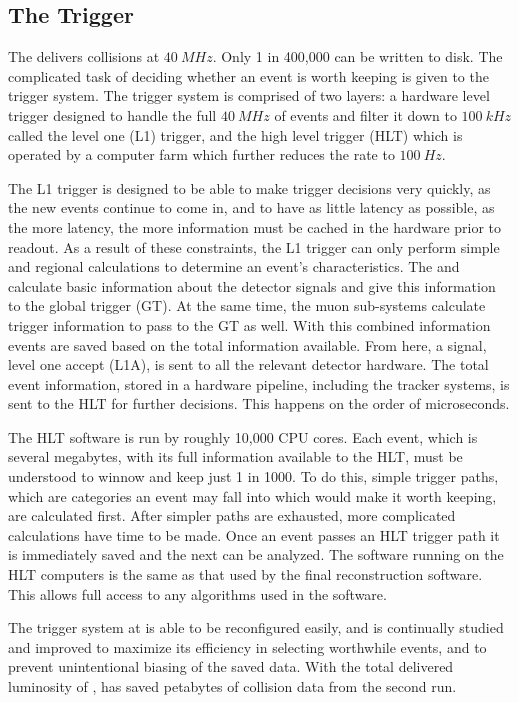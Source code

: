 \subsection{The Trigger}

The \LHC delivers collisions at \ensuremath{\SI{40}{MHz}}. Only 1 in 400,000 can be written to disk. The complicated task of deciding whether an event is worth keeping is given to the trigger system. The \CMS trigger system is comprised of two layers: a hardware level trigger designed to handle the full \ensuremath{\SI{40}{MHz}} of events and filter it down to \ensuremath{\SI{100}{kHz}} called the level one (L1) trigger, and the high level trigger (HLT) which is operated by a computer farm which further reduces the rate to \ensuremath{\SI{100}{Hz}}.

The L1 trigger is designed to be able to make trigger decisions very quickly, as the new events continue to come in, and to have as little latency as possible, as the more latency, the more information must be cached in the hardware prior to readout.  As a result of these constraints, the L1 trigger can only perform simple and regional calculations to determine an event's characteristics.  The \ECAL and \HCAL calculate basic information about the detector signals and give this information to the global trigger (GT).  At the same time, the muon sub-systems calculate trigger information to pass to the GT as well. With this combined information events are saved based on the total information available.  From here, a signal, level one accept (L1A), is sent to all the relevant detector hardware. The total event information, stored in a hardware pipeline, including the tracker systems, is sent to the HLT for further decisions. This happens on the order of microseconds.

The HLT software is run by roughly 10,000 CPU cores.  Each event, which is several megabytes, with its full information available to the HLT, must be understood to winnow and keep just 1 in 1000.  To do this, simple trigger paths, which are categories an event may fall into which would make it worth keeping, are calculated first.  After simpler paths are exhausted, more complicated calculations have time to be made.  Once an event passes an HLT trigger path it is immediately saved and the next can be analyzed.  The software running on the HLT computers is the same as that used by the final reconstruction software.  This allows full access to any algorithms used in the software.

The trigger system at \CMS is able to be reconfigured easily, and is continually studied and improved to maximize its efficiency in selecting worthwhile events, and to prevent unintentional biasing of the saved data.
With the total delivered luminosity of \GLNTOTALII , \CMS has saved petabytes of collision data from the second run.

